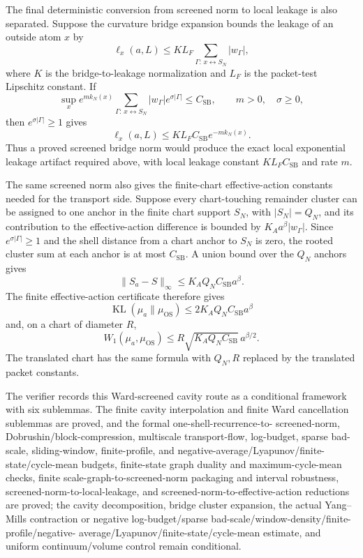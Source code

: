 The final deterministic conversion from screened norm to local leakage is also
separated. Suppose the curvature bridge expansion bounds the leakage of an
outside atom $x$ by
\[
  \ell_x(a,L)
  \leq
  K L_F
  \sum_{\Gamma:\,x\leftrightarrow S_N}|w_\Gamma|,
\]
where $K$ is the bridge-to-leakage normalization and $L_F$ is the packet-test
Lipschitz constant. If
\[
  \sup_x e^{m k_N(x)}
  \sum_{\Gamma:\,x\leftrightarrow S_N}
  |w_\Gamma|e^{\sigma|\Gamma|}
  \leq C_{\mathrm{SB}},
  \qquad m>0,\quad \sigma\geq0,
\]
then $e^{\sigma|\Gamma|}\geq1$ gives
\[
  \ell_x(a,L)
  \leq
  K L_F C_{\mathrm{SB}} e^{-m k_N(x)}.
\]
Thus a proved screened bridge norm would produce the exact local exponential
leakage artifact required above, with local leakage constant
$K L_F C_{\mathrm{SB}}$ and rate $m$.

The same screened norm also gives the finite-chart effective-action constants
needed for the transport side. Suppose every chart-touching remainder cluster
can be assigned to one anchor in the finite chart support $S_N$, with
$|S_N|=Q_N$, and its contribution to the effective-action difference is bounded
by $K_Aa^\beta |w_\Gamma|$. Since $e^{\sigma|\Gamma|}\geq1$ and the shell
distance from a chart anchor to $S_N$ is zero, the rooted cluster sum at each
anchor is at most $C_{\mathrm{SB}}$. A union bound over the $Q_N$ anchors gives
\[
  \|S_a-S\|_\infty
  \leq
  K_A Q_N C_{\mathrm{SB}} a^\beta .
\]
The finite effective-action certificate therefore gives
\[
  \operatorname{KL}(\mu_a\|\mu_{\mathrm{OS}})
  \leq
  2K_A Q_N C_{\mathrm{SB}} a^\beta
\]
and, on a chart of diameter $R$,
\[
  W_1(\mu_a,\mu_{\mathrm{OS}})
  \leq
  R\sqrt{K_A Q_N C_{\mathrm{SB}}}\,a^{\beta/2}.
\]
The translated chart has the same formula with $Q_N,R$ replaced by the
translated packet constants.

The verifier records this Ward-screened cavity route as a conditional framework
with six sublemmas. The finite cavity interpolation and finite Ward
cancellation sublemmas are proved, and the formal one-shell-recurrence-to-
screened-norm, Dobrushin/block-compression, multiscale transport-flow,
log-budget, sparse bad-scale, sliding-window, finite-profile, and
negative-average/Lyapunov/finite-state/cycle-mean budgets,
finite-state graph duality and maximum-cycle-mean checks,
finite scale-graph-to-screened-norm packaging and interval robustness,
screened-norm-to-local-leakage, and
screened-norm-to-effective-action reductions are proved; the cavity
decomposition, bridge cluster expansion, the actual Yang--Mills contraction or
negative log-budget/sparse bad-scale/window-density/finite-profile/negative-
average/Lyapunov/finite-state/cycle-mean estimate, and uniform
continuum/volume control remain conditional.

